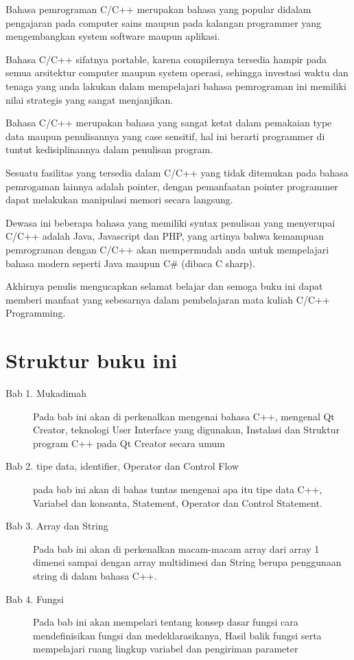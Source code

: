 Bahasa pemrograman C/C++ merupakan bahasa yang popular didalam
pengajaran pada computer sains maupun pada kalangan programmer yang
mengembangkan system software maupun aplikasi.

Bahasa C/C++ sifatnya portable, karena compilernya tersedia hampir pada
semua arsitektur computer maupun system operasi, sehingga investasi
waktu dan tenaga yang anda lakukan dalam mempelajari bahasa pemrograman
ini memiliki nilai strategis yang sangat menjanjikan.

Bahasa C/C++ merupakan bahasa yang sangat ketat dalam pemakaian type
data maupun penulisannya yang case sensitif, hal ini berarti programmer
di tuntut kedisiplinannya dalam penulisan program.

Sesuatu fasilitas yang tersedia dalam C/C++ yang tidak ditemukan pada
bahasa pemrogaman lainnya adalah pointer, dengan pemanfaatan pointer
programmer dapat melakukan manipulasi memori secara langsung.

Dewasa ini beberapa bahasa yang memiliki syntax penulisan yang
menyerupai C/C++ adalah Java, Javascript dan PHP, yang artinya bahwa
kemampuan pemrograman dengan C/C++ akan mempermudah anda untuk
mempelajari bahasa modern seperti Java maupun C\# (dibaca C sharp).

Akhirnya penulis mengucapkan selamat belajar dan semoga buku ini dapat
memberi manfaat yang sebesarnya dalam pembelajaran mata kuliah C/C++
Programming.

\section*{Struktur buku ini}

\begin{description}
	\item[Bab 1. Mukadimah] Pada bab ini akan di perkenalkan mengenai
	 bahasa C++, mengenal Qt Creator, teknologi User Interface yang 
	 digunakan, Instalasi dan Struktur program C++ pada Qt Creator secara umum 
	\item[Bab 2. tipe data, identifier, Operator dan Control Flow] 
	pada bab ini akan di bahas tuntas mengenai apa itu tipe data C++, 
	Variabel dan konsanta, Statement, Operator dan Control Statement.
	\item[Bab 3. Array dan String] Pada bab ini akan di perkenalkan 
	macam-macam array dari array 1 dimensi sampai dengan array 
	multidimesi dan String berupa penggunaan string di dalam bahasa C++.
	\item[Bab 4. Fungsi] Pada bab ini akan mempelari tentang konsep dasar
	fungsi cara mendefinisikan fungsi dan medeklarasikanya, Hasil balik
	fungsi serta mempelajari ruang lingkup variabel dan pengiriman parameter

\end{description}